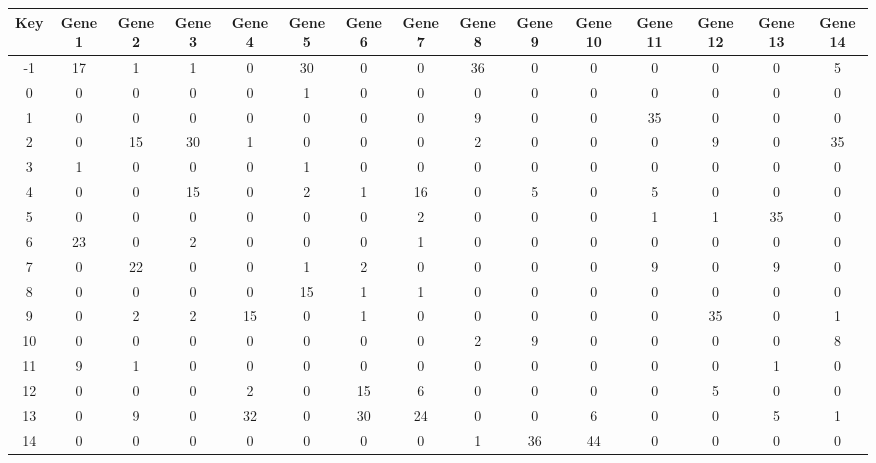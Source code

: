 \begin{tabular}{|c|c|c|c|c|c|c|c|c|c|c|c|c|c|c|}
\hline
Key & Gene 1 & Gene 2 & Gene 3 & Gene 4 & Gene 5 & Gene 6 & Gene 7 & Gene 8 & Gene 9 & Gene 10 & Gene 11 & Gene 12 & Gene 13 & Gene 14 \\
\hline
-1 & 17 & 1 & 1 & 0 & 30 & 0 & 0 & 36 & 0 & 0 & 0 & 0 & 0 & 5 \\
0 & 0 & 0 & 0 & 0 & 1 & 0 & 0 & 0 & 0 & 0 & 0 & 0 & 0 & 0 \\
1 & 0 & 0 & 0 & 0 & 0 & 0 & 0 & 9 & 0 & 0 & 35 & 0 & 0 & 0 \\
2 & 0 & 15 & 30 & 1 & 0 & 0 & 0 & 2 & 0 & 0 & 0 & 9 & 0 & 35 \\
3 & 1 & 0 & 0 & 0 & 1 & 0 & 0 & 0 & 0 & 0 & 0 & 0 & 0 & 0 \\
4 & 0 & 0 & 15 & 0 & 2 & 1 & 16 & 0 & 5 & 0 & 5 & 0 & 0 & 0 \\
5 & 0 & 0 & 0 & 0 & 0 & 0 & 2 & 0 & 0 & 0 & 1 & 1 & 35 & 0 \\
6 & 23 & 0 & 2 & 0 & 0 & 0 & 1 & 0 & 0 & 0 & 0 & 0 & 0 & 0 \\
7 & 0 & 22 & 0 & 0 & 1 & 2 & 0 & 0 & 0 & 0 & 9 & 0 & 9 & 0 \\
8 & 0 & 0 & 0 & 0 & 15 & 1 & 1 & 0 & 0 & 0 & 0 & 0 & 0 & 0 \\
9 & 0 & 2 & 2 & 15 & 0 & 1 & 0 & 0 & 0 & 0 & 0 & 35 & 0 & 1 \\
10 & 0 & 0 & 0 & 0 & 0 & 0 & 0 & 2 & 9 & 0 & 0 & 0 & 0 & 8 \\
11 & 9 & 1 & 0 & 0 & 0 & 0 & 0 & 0 & 0 & 0 & 0 & 0 & 1 & 0 \\
12 & 0 & 0 & 0 & 2 & 0 & 15 & 6 & 0 & 0 & 0 & 0 & 5 & 0 & 0 \\
13 & 0 & 9 & 0 & 32 & 0 & 30 & 24 & 0 & 0 & 6 & 0 & 0 & 5 & 1 \\
14 & 0 & 0 & 0 & 0 & 0 & 0 & 0 & 1 & 36 & 44 & 0 & 0 & 0 & 0 \\
\hline
\end{tabular}